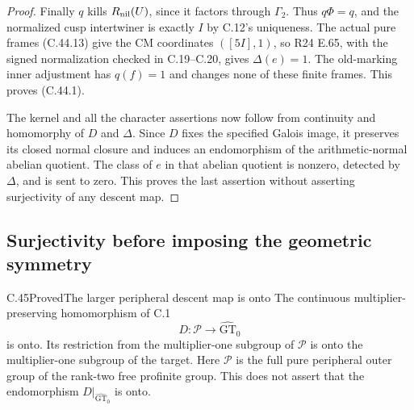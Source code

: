 \begin{proof}
Finally $q$ kills $R_{\rm nil}(U)$, since it factors through
$\Gamma_2$. Thus $q\Phi=q$, and the normalized cusp intertwiner
is exactly $I$ by C.12's uniqueness. The actual pure frames
(C.44.13) give the CM coordinates $([5I],1)$, so R24 E.65,
with the signed normalization checked in C.19--C.20, gives
$\Delta(e)=1$. The old-marking inner adjustment has $q(f)=1$
and changes none of these finite frames. This proves (C.44.1).

The kernel and all the character assertions now follow from
continuity and homomorphy of $D$ and $\Delta$. Since $D$ fixes
the specified Galois image, it preserves its closed normal
closure and induces an endomorphism of the arithmetic-normal
abelian quotient. The class of $e$ in that abelian quotient is
nonzero, detected by $\Delta$, and is sent to zero. This proves
the last assertion without asserting surjectivity of any descent map.
\end{proof}


\subsection{Surjectivity before imposing the geometric symmetry}

\begin{statement}{C.45}{Proved}{The larger peripheral descent map is onto}
The continuous multiplier-preserving homomorphism of C.1
\[
                    D:\mathcal P\longrightarrow
                       \widehat{\mathrm{GT}}_0
\]
is onto. Its restriction from the multiplier-one subgroup of
$\mathcal P$ is onto the multiplier-one subgroup of the target.
Here $\mathcal P$ is the full pure peripheral outer group of the
rank-two free profinite group. This does not assert that the
endomorphism $D|_{\widehat{\mathrm{GT}}_0}$ is onto.
\end{statement}

